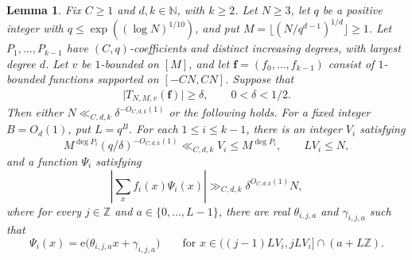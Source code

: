 \documentclass[12pt]{amsart}
\newcommand{\1}{\mathbf 1}
\newcommand{\e}{\mathrm e}
\newtheorem{lemma}[theorem]{Lemma}
\theoremstyle{definition}
\begin{document}
\begin{lemma}\label{p:localinverse}
Fix \(C\ge1\) and \(d,k\in\mathbb N\), with \(k\ge2\). Let \(N\ge3\),
let \(q\) be a positive integer with
\(q\le\exp((\log N)^{1/10})\), and put
\(M=\lfloor(N/q^{d-1})^{1/d}\rfloor\ge1\).
Let \(P_1,\ldots,P_{k-1}\) have \((C,q)\)-coefficients and distinct
increasing degrees, with largest degree \(d\). Let \(v\) be
\(1\)-bounded on \([M]\), and let
\(\mathbf f=(f_0,\ldots,f_{k-1})\) consist of \(1\)-bounded functions
supported on \([-CN,CN]\).
Suppose that 
\begin{align}\label{e:Tmnvcondition}
    \lvert T_{N,M,v}(\mathbf f)\rvert\ge\delta, \qquad 0<\delta<1/2.
\end{align}
 Then either \(N\ll_{C,d,k}\delta^{-O_{C,d,k}(1)}\)
or the following holds. For a fixed integer \(B=O_d(1)\), put \(L=q^B\).
For each \(1\le i\le k-1\), there is an integer \(V_i\) satisfying
\[
 M^{\deg P_i}(q/\delta)^{-O_{C,d,k}(1)}
 \ll_{C,d,k} V_i\le M^{\deg P_i},
 \qquad LV_i\le N,
\]
and a function \(\Psi_i\) satisfying
\[
 \left|\sum_x f_i(x)\Psi_i(x)\right|
 \gg_{C,d,k}\delta^{O_{C,d,k}(1)}N,
\]
where for every \(j\in\mathbb Z\) and \(a\in\{0,\ldots,L-1\}\), there are
real \(\theta_{i,j,a}\) and \(\gamma_{i,j,a}\) such that
\[
 \Psi_i(x)=\e\bigl(\theta_{i,j,a}x+\gamma_{i,j,a}\bigr)
 \qquad
 \text{for }x\in ((j-1)LV_i,jLV_i]\cap(a+L\mathbb Z).
\]
\end{lemma}
\end{document}
